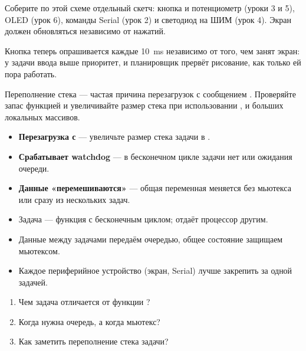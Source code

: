 Соберите по этой схеме отдельный скетч: кнопка и потенциометр (уроки 3 и 5), OLED (урок 6), команды
Serial (урок 2) и светодиод на ШИМ (урок 4). Экран должен обновляться независимо от нажатий.

Кнопка теперь опрашивается каждые \SI{10}{ms} независимо от того, чем занят экран: у задачи ввода
выше приоритет, и планировщик прервёт рисование, как только ей пора работать.

\begin{caution}
Переполнение стека --- частая причина перезагрузок с сообщением .
Проверяйте запас функцией  и увеличивайте размер стека при
использовании ,  и больших локальных массивов.
\end{caution}

\begin{trouble}
\begin{itemize}[leftmargin=*]
  \item \textbf{Перезагрузка с } --- увеличьте размер стека задачи в .
  \item \textbf{Срабатывает watchdog} --- в бесконечном цикле задачи нет  или ожидания очереди.
  \item \textbf{Данные «перемешиваются»} --- общая переменная меняется без мьютекса или сразу из нескольких задач.
\end{itemize}
\end{trouble}

\begin{summary}
\begin{itemize}[leftmargin=*]
  \item Задача --- функция с бесконечным циклом;  отдаёт процессор другим.
  \item Данные между задачами передаём очередью, общее состояние защищаем мьютексом.
  \item Каждое периферийное устройство (экран, Serial) лучше закрепить за одной задачей.
\end{itemize}
\end{summary}

\begin{selfcheck}
\begin{enumerate}
  \item Чем задача отличается от функции ?
  \item Когда нужна очередь, а когда мьютекс?
  \item Как заметить переполнение стека задачи?
\end{enumerate}
\end{selfcheck}

